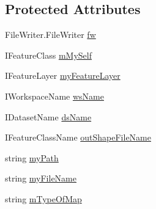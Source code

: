 \subsection*{Protected Attributes}
\begin{DoxyCompactItemize}
\item 
File\-Writer.\-File\-Writer \hyperlink{class_p_a_z___dispersal_1_1_map_a0c94dc7b90808428b52d5f5a93531a54}{fw}
\item 
I\-Feature\-Class \hyperlink{class_p_a_z___dispersal_1_1_map_aa77703e80677c7dc1311af7d656c021b}{m\-My\-Self}
\item 
I\-Feature\-Layer \hyperlink{class_p_a_z___dispersal_1_1_map_abd38307612fc3f7c6078aa54bb62b72b}{my\-Feature\-Layer}
\item 
I\-Workspace\-Name \hyperlink{class_p_a_z___dispersal_1_1_map_aa57ce9aa2ae8622cf91106b20e3a8c9a}{ws\-Name}
\item 
I\-Dataset\-Name \hyperlink{class_p_a_z___dispersal_1_1_map_a509923fc959f1a2641b54535209f030e}{ds\-Name}
\item 
I\-Feature\-Class\-Name \hyperlink{class_p_a_z___dispersal_1_1_map_acbf80095966e92d7e50d542e28aed664}{out\-Shape\-File\-Name}
\item 
string \hyperlink{class_p_a_z___dispersal_1_1_map_a94ebd979209383d8a7543682dddc054c}{my\-Path}
\item 
string \hyperlink{class_p_a_z___dispersal_1_1_map_ac1cbfad222aec5bb1e3cc02fdd9424ea}{my\-File\-Name}
\item 
string \hyperlink{class_p_a_z___dispersal_1_1_map_ad801859bf3e6bef5fe46eec40ad43370}{m\-Type\-Of\-Map}
\end{DoxyCompactItemize}
